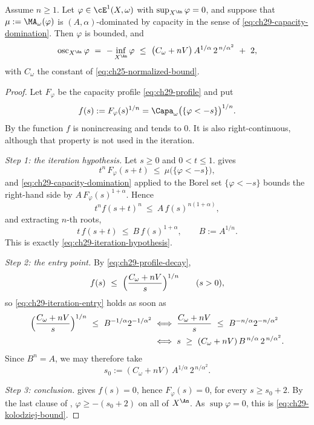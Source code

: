 \begin{theorem}
\label{thm:ch29-kolodziej-linfty}
Assume $n\geq1$.  Let $\varphi\in\cE^1(X,\omega)$ with
$\sup_{X^{\An}}\varphi=0$, and suppose that
$\mu:=\MA_\omega(\varphi)$ is $(A,\alpha)$-dominated by
capacity in the sense of \eqref{eq:ch29-capacity-domination}.  Then
$\varphi$ is bounded, and
\begin{equation}
\label{eq:ch29-kolodziej-bound}
 \operatorname{osc}_{X^{\An}}\varphi
 \ =\ -\inf_{X^{\An}}\varphi
 \ \leq\ \bigl(C_\omega+nV\bigr)\,A^{1/\alpha}\,2^{\,n/\alpha^2}\ +\ 2 ,
\end{equation}
with $C_\omega$ the constant of \eqref{eq:ch25-normalized-bound}.
\end{theorem}

\begin{proof}
Let $F_\varphi$ be the capacity profile \eqref{eq:ch29-profile} and put
\[
 f(s):=F_\varphi(s)^{1/n}=\Capa_\omega\bigl(\{\varphi<-s\}\bigr)^{1/n}.
\]
By  the function $f$ is nonincreasing
and tends to $0$.  It is also right-continuous, although that
property is not used in the iteration.

\emph{Step 1: the iteration hypothesis.}  Let $s\geq0$ and
$0<t\leq1$.   gives
\[
 t^n\,F_\varphi(s+t)\ \leq\ \mu\bigl(\{\varphi<-s\}\bigr),
\]
and \eqref{eq:ch29-capacity-domination} applied to the Borel set
$\{\varphi<-s\}$ bounds the right-hand side by
$A\,F_\varphi(s)^{1+\alpha}$.  Hence
\[
 t^n f(s+t)^n\ \leq\ A\,f(s)^{n(1+\alpha)} ,
\]
and extracting $n$-th roots,
\begin{equation}
\label{eq:ch29-iteration-verified}
 t\,f(s+t)\ \leq\ B\,f(s)^{1+\alpha},
 \qquad B:=A^{1/n}.
\end{equation}
This is exactly \eqref{eq:ch29-iteration-hypothesis}.

\emph{Step 2: the entry point.}  By \eqref{eq:ch29-profile-decay},
\[
 f(s)\ \leq\ \Bigl(\frac{C_\omega+nV}{s}\Bigr)^{1/n}
 \qquad(s>0),
\]
so \eqref{eq:ch29-iteration-entry} holds as soon as
\[
\begin{aligned}
 \Bigl(\frac{C_\omega+nV}{s}\Bigr)^{1/n}
 \ \leq\ B^{-1/\alpha}2^{-1/\alpha^2}
 &\iff
 \frac{C_\omega+nV}{s}\ \leq\ B^{-n/\alpha}2^{-n/\alpha^2}\\
 &\iff
 s\ \geq\ (C_\omega+nV)\,B^{\,n/\alpha}\,2^{\,n/\alpha^2}.
\end{aligned}
\]
Since $B^{n}=A$, we may therefore take
\begin{equation}
\label{eq:ch29-entry-point}
 s_0:=(C_\omega+nV)\,A^{1/\alpha}\,2^{\,n/\alpha^2}.
\end{equation}

\emph{Step 3: conclusion.}   gives $f(s)=0$, hence
$F_\varphi(s)=0$, for every $s\geq s_0+2$.  By the last clause of
, $\varphi\geq-(s_0+2)$ on all of
$X^{\An}$.  As $\sup\varphi=0$, this is
\eqref{eq:ch29-kolodziej-bound}.
\end{proof}

